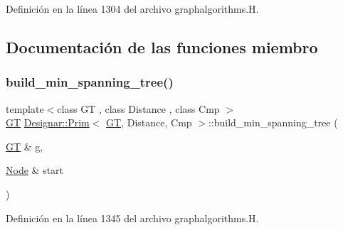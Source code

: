 Definición en la línea 1304 del archivo graphalgorithms.\+H.



\subsection{Documentación de las funciones miembro}
\mbox{\label{class_designar_1_1_prim_a39e561f33cf1a98dc599d81f01948a16}} 
\subsubsection{\texorpdfstring{build\+\_\+min\+\_\+spanning\+\_\+tree()}{build\_min\_spanning\_tree()}\hspace{0.1cm}{\footnotesize\ttfamily [1/2]}}
{\footnotesize\ttfamily template$<$class GT , class Distance , class Cmp $>$ \\
\hyperlink{demo-buildgraph_8_c_a3001c40d2c31ca87ed96cd7d1334a55e}{GT} \hyperlink{class_designar_1_1_prim}{Designar\+::\+Prim}$<$ \hyperlink{demo-buildgraph_8_c_a3001c40d2c31ca87ed96cd7d1334a55e}{GT}, Distance, Cmp $>$\+::build\+\_\+min\+\_\+spanning\+\_\+tree (\begin{DoxyParamCaption}\item[{\hyperlink{demo-buildgraph_8_c_a3001c40d2c31ca87ed96cd7d1334a55e}{GT} \&}]{g,  }\item[{\hyperlink{class_designar_1_1_prim_a61fb55303a5350e0a6dadd5472571ba6}{Node} \&}]{start }\end{DoxyParamCaption})}



Definición en la línea 1345 del archivo graphalgorithms.\+H.

\mbox{\label{class_designar_1_1_prim_a57b6f5db0d64fc287fc6beb5ffb3713d}} 
